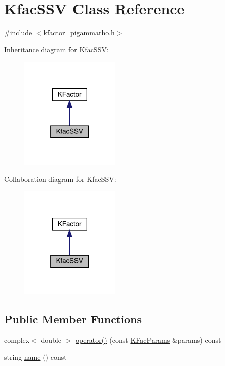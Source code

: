 \hypertarget{classKfacSSV}{}\section{Kfac\+S\+SV Class Reference}
\label{classKfacSSV}


{\ttfamily \#include $<$kfactor\+\_\+pigammarho.\+h$>$}



Inheritance diagram for Kfac\+S\+SV\+:
\nopagebreak
\begin{figure}[H]
\begin{center}
\leavevmode
\includegraphics[width=136pt]{df/dda/classKfacSSV__inherit__graph}
\end{center}
\end{figure}


Collaboration diagram for Kfac\+S\+SV\+:
\nopagebreak
\begin{figure}[H]
\begin{center}
\leavevmode
\includegraphics[width=136pt]{de/da3/classKfacSSV__coll__graph}
\end{center}
\end{figure}
\subsection*{Public Member Functions}
\begin{DoxyCompactItemize}
\item 
complex$<$ double $>$ \mbox{\hyperlink{classKfacSSV_ad9bddcf643847eebae9926bbc646c56c}{operator()}} (const \mbox{\hyperlink{classKFacParams}{K\+Fac\+Params}} \&params) const
\item 
string \mbox{\hyperlink{classKfacSSV_a72d5e577525fa97365dbcfd4c5bea88d}{name}} () const
\end{DoxyCompactItemize}


